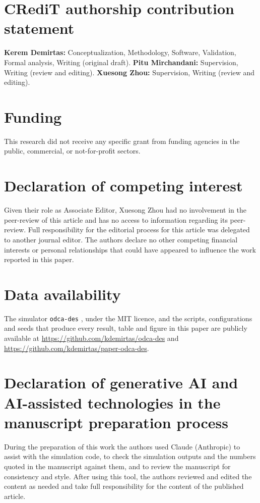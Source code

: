\documentclass[review,number]{elsarticle}
\begin{document}
\section*{CRediT authorship contribution statement}
\textbf{Kerem Demirtas:} Conceptualization, Methodology, Software, Validation, Formal analysis, Writing (original draft).
\textbf{Pitu Mirchandani:} Supervision, Writing (review and editing).
\textbf{Xuesong Zhou:} Supervision, Writing (review and editing).

\section*{Funding}
This research did not receive any specific grant from funding agencies in the public, commercial, or not-for-profit sectors.

\section*{Declaration of competing interest}
Given their role as Associate Editor, Xuesong Zhou had no involvement in the peer-review of this article and has no access to information regarding its peer-review. Full responsibility for the editorial process for this article was delegated to another journal editor. The authors declare no other competing financial interests or personal relationships that could have appeared to influence the work reported in this paper.

\section*{Data availability}
The simulator \texttt{odca-des} \citep{demirtas2026odcades}, under the MIT licence, and the scripts, configurations and seeds that produce every result, table and figure in this paper are publicly available at \url{https://github.com/kdemirtas/odca-des} and \url{https://github.com/kdemirtas/paper-odca-des}.

\section*{Declaration of generative AI and AI-assisted technologies in the manuscript preparation process}
During the preparation of this work the authors used Claude (Anthropic) to assist with the simulation code, to check the simulation outputs and the numbers quoted in the manuscript against them, and to review the manuscript for consistency and style. After using this tool, the authors reviewed and edited the content as needed and take full responsibility for the content of the published article.



\end{document}
